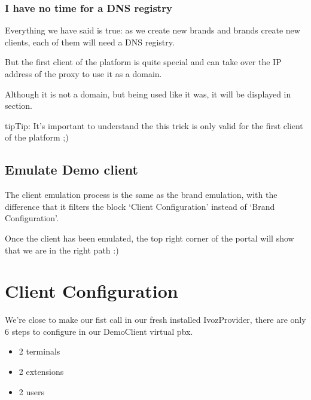 \documentclass[letterpaper,10pt,english]{sphinxmanual}
\begin{document}
\subsubsection{I have no time for a DNS registry}
\label{getting_started/internal_calls/brand_portal:dnshack}\label{getting_started/internal_calls/brand_portal:i-have-no-time-for-a-dns-registry}
Everything we have said is true: as we create new brands and brands create new
clients, each of them will need a DNS registry.

But the first client of the platform is quite special and can take over the IP
address of the proxy to use it as a domain.

Although it is not a domain, but being used like it was, it will be displayed
in {\hyperref[administration_portal/platform/sip_domains:sip\string-domains]{}} section.

\begin{notice}{tip}{Tip:}
It’s important to understand the this trick is only valid for the first
client of the platform ;)
\end{notice}


\subsection{Emulate Demo client}
\label{getting_started/internal_calls/brand_portal:emulate-client}\label{getting_started/internal_calls/brand_portal:emulate-demo-client}
The client emulation process is the same as the brand emulation, with the
difference that it filters the block ‘Client Configuration’ instead of
‘Brand Configuration’.

Once the client has been emulated, the top right corner of the portal will
show that we are in the right path :)


\section{Client Configuration}
\label{getting_started/internal_calls/client_portal:client-configuration}\label{getting_started/internal_calls/client_portal::doc}
We're close to make our fist call in our fresh installed IvozProvider, there
are only 6 steps to configure in our DemoClient virtual pbx.
\begin{itemize}
\item {} 
2 terminals

\item {} 
2 extensions

\item {} 
2 users

\end{itemize}
\end{document}
